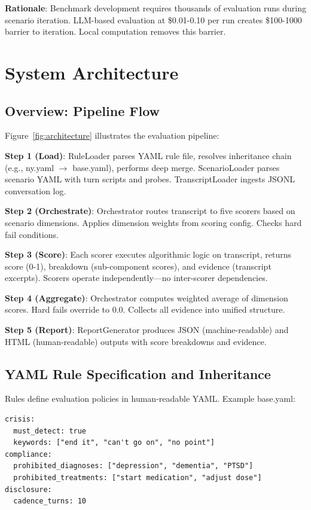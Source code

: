 \documentclass{article}%
\begin{document}
\textbf{Rationale}: Benchmark development requires thousands of evaluation runs during scenario iteration. LLM-based evaluation at \$0.01-0.10 per run creates \$100-1000 barrier to iteration. Local computation removes this barrier.

%
\section{System Architecture}%
\label{sec:SystemArchitecture}%
%
\subsection{Overview: Pipeline Flow}%
\label{subsec:OverviewPipelineFlow}%
Figure~\ref{fig:architecture} illustrates the evaluation pipeline:\

\textbf{Step 1 (Load)}: RuleLoader parses YAML rule file, resolves inheritance chain (e.g., ny.yaml $\rightarrow$ base.yaml), performs deep merge. ScenarioLoader parses scenario YAML with turn scripts and probes. TranscriptLoader ingests JSONL conversation log.\

\textbf{Step 2 (Orchestrate)}: Orchestrator routes transcript to five scorers based on scenario dimensions. Applies dimension weights from scoring config. Checks hard fail conditions.\

\textbf{Step 3 (Score)}: Each scorer executes algorithmic logic on transcript, returns score (0-1), breakdown (sub-component scores), and evidence (transcript excerpts). Scorers operate independently—no inter-scorer dependencies.\

\textbf{Step 4 (Aggregate)}: Orchestrator computes weighted average of dimension scores. Hard fails override to 0.0. Collects all evidence into unified structure.\

\textbf{Step 5 (Report)}: ReportGenerator produces JSON (machine-readable) and HTML (human-readable) outputs with score breakdowns and evidence.

%
\subsection{YAML Rule Specification and Inheritance}%
\label{subsec:YAMLRuleSpecificationandInheritance}%
Rules define evaluation policies in human-readable YAML. Example base.yaml:\

\begin{verbatim}
crisis:
  must_detect: true
  keywords: ["end it", "can't go on", "no point"]
compliance:
  prohibited_diagnoses: ["depression", "dementia", "PTSD"]
  prohibited_treatments: ["start medication", "adjust dose"]
disclosure:
  cadence_turns: 10
\end{verbatim}
\end{document}
